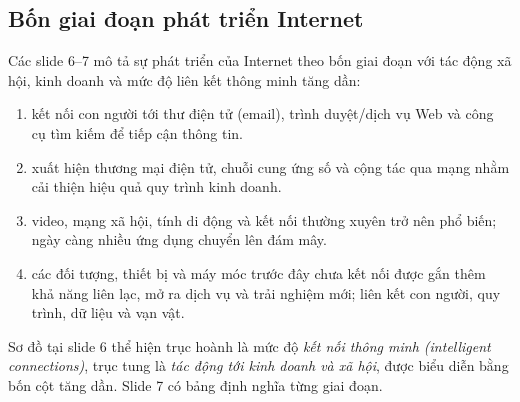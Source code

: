 \subsection{Bốn giai đoạn phát triển Internet}
Các slide 6--7 mô tả sự phát triển của Internet theo bốn giai đoạn với tác động xã hội, kinh doanh và mức độ liên kết thông minh tăng dần:
\begin{enumerate}
\item {} kết nối con người tới thư điện tử (email), trình duyệt/dịch vụ Web và công cụ tìm kiếm để tiếp cận thông tin.
\item {} xuất hiện thương mại điện tử, chuỗi cung ứng số và cộng tác qua mạng nhằm cải thiện hiệu quả quy trình kinh doanh.
\item {} video, mạng xã hội, tính di động và kết nối thường xuyên trở nên phổ biến; ngày càng nhiều ứng dụng chuyển lên đám mây.
\item {} các đối tượng, thiết bị và máy móc trước đây chưa kết nối được gắn thêm khả năng liên lạc, mở ra dịch vụ và trải nghiệm mới; liên kết con người, quy trình, dữ liệu và vạn vật.
\end{enumerate}
Sơ đồ tại slide 6 thể hiện trục hoành là mức độ \emph{kết nối thông minh (intelligent connections)}, trục tung là \emph{tác động tới kinh doanh và xã hội}, được biểu diễn bằng bốn cột tăng dần. Slide 7 có bảng định nghĩa từng giai đoạn.

